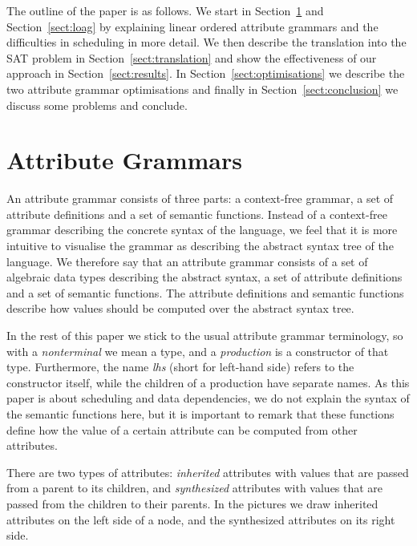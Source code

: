 \documentclass{llncs}
\newcommand{\sectref}[1]{Section~\ref{#1}}
\begin{document}
The outline of the paper is as follows. We start in \sectref{sect:ag} and \sectref{sect:loag} by explaining linear ordered attribute grammars and the difficulties in scheduling in more detail. We then describe the translation into the SAT problem in \sectref{sect:translation} and show the effectiveness of our approach in \sectref{sect:results}. In \sectref{sect:optimisations} we describe the two attribute grammar optimisations and finally in \sectref{sect:conclusion} we discuss some problems and conclude.


\section{Attribute Grammars} \label{sect:ag}
An attribute grammar consists of three parts: a context-free grammar, a set of attribute definitions and a set of semantic functions. Instead of a context-free grammar describing the concrete syntax of the language, we feel that it is more intuitive to visualise the grammar as describing the abstract syntax tree of the language. We therefore say that an attribute grammar consists of a set of algebraic data types describing the abstract syntax, a set of attribute definitions and a set of semantic functions. The attribute definitions and semantic functions describe how values should be computed over the abstract syntax tree.

In the rest of this paper we stick to the usual attribute grammar terminology, so with a \emph{nonterminal} we mean a type, and a \emph{production} is a constructor of that type. Furthermore, the name \emph{lhs} (short for left-hand side) refers to the constructor itself, while the children of a production have separate names. As this paper is about scheduling and data dependencies, we do not explain the syntax of the semantic functions here, but it is important to remark that these functions define how the value of a certain attribute can be computed from other attributes.

There are two types of attributes: \emph{inherited} attributes with values that are passed from a parent to its children, and \emph{synthesized} attributes with values that are passed from the children to their parents. In the pictures we draw inherited attributes on the left side of a node, and the synthesized attributes on its right side.

\end{document}

